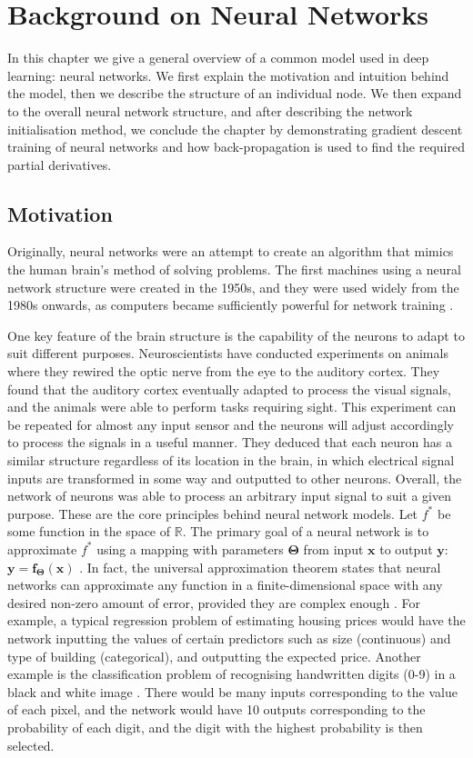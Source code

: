 \documentclass[honours,12pt]{unswthesis}
\newcommand{\R}{\mathbb{R}}
\numberwithin{equation}{section}
\theoremstyle{definition}
\begin{document}

\chapter{Background on Neural Networks}
In this chapter we give a general overview of a common model used in deep learning: neural networks. We first explain the motivation and intuition behind the model, then we describe the structure of an individual node. We then expand to the overall neural network structure, and after describing the network initialisation method, we conclude the chapter by demonstrating gradient descent training of neural networks and how back-propagation is used to find the required partial derivatives.
\section{Motivation}
Originally, neural networks were an attempt to create an algorithm that mimics the human brain's method of solving problems. The first machines using a neural network structure were created in the 1950s, and they were used widely from the 1980s onwards, as computers became sufficiently powerful for network training \citep{DeepLearning}.

One key feature of the brain structure is the capability of the neurons to adapt to suit different purposes\cite{neuroplast}. Neuroscientists have conducted experiments on animals where they rewired the optic nerve from the eye to the auditory cortex. They found that the auditory cortex eventually adapted to process the visual signals, and the animals were able to perform tasks requiring sight. This experiment can be repeated for almost any input sensor and the neurons will adjust accordingly to process the signals in a useful manner. They deduced that each neuron has a similar structure regardless of its location in the brain, in which electrical signal inputs are transformed in some way and outputted to other neurons. Overall, the network of neurons was able to process an arbitrary input signal to suit a given purpose\cite{neuroplast}. These are the core principles behind neural network models.
\newpage
Let $f^*$ be some function in the space of $\R$. The primary goal of a neural network is to approximate $f^*$ using a mapping with parameters $\bm{\Theta}$ from input $\bm{x}$ to output $\bm{y}$: $\bm{y}=\bm{f}_{\bm{\Theta}}(\bm{x})$ \citep{DeepLearning}. In fact, the universal approximation theorem states that neural networks can approximate any function in a finite-dimensional space with any desired non-zero amount of error, provided they are complex enough \citep{universal, cybenko}. For example, a typical regression problem of estimating housing prices would have the network inputting the values of certain predictors such as size (continuous) and type of building (categorical), and outputting the expected price. Another example is the classification problem of recognising handwritten digits (0-9) in a black and white image \citep{mnist}. There would be many inputs corresponding to the value of each pixel, and the network would have 10 outputs corresponding to the probability of each digit, and the digit with the highest probability is then selected.
\end{document}
